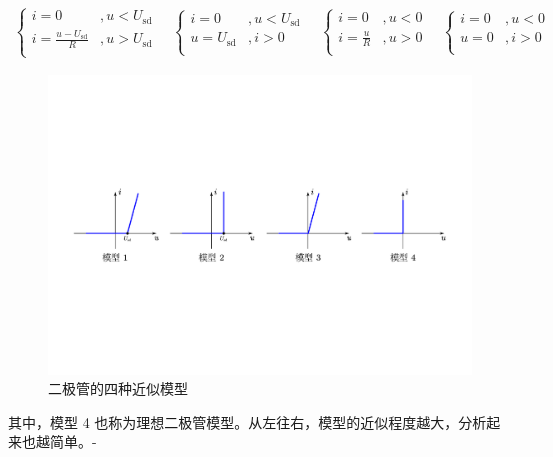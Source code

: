 \documentclass[UTF8]{report}
\theoremstyle{MyLineTheoremStyle} %
\theoremstyle{MyBlockTheoremStyle} %
\theoremstyle{MySubsubsectionStyle} %
\begin{document}
\begin{gather}
\begin{cases}
    i = 0                                &, u < U_{\text{sd}} \\ 
    i = \frac{u - U_{\text{sd}}}{R} &, u > U_{\text{sd}} \\
\end{cases}\quad 
\begin{cases}
    i = 0 &, u < U_{\text{sd}} \\ 
    u = U_{\text{sd}} &, i > 0 \\
\end{cases}\quad 
\begin{cases}
    i = 0 &, u < 0 \\ 
    i = \frac{u}{R} &, u > 0 \\
\end{cases}\quad 
\begin{cases}
    i = 0 &, u < 0 \\ 
    u = 0 &, i > 0 \\
\end{cases}
\end{gather}
\begin{figure}[H]\centering
\includegraphics[width=\columnwidth]{assets/4/二极管的四种近似模型.pdf}
\caption{二极管的四种近似模型}\label{二极管的四种近似模型}
\end{figure}
其中，模型 4 也称为理想二极管模型。从左往右，模型的近似程度越大，分析起来也越简单。-
\end{document}
